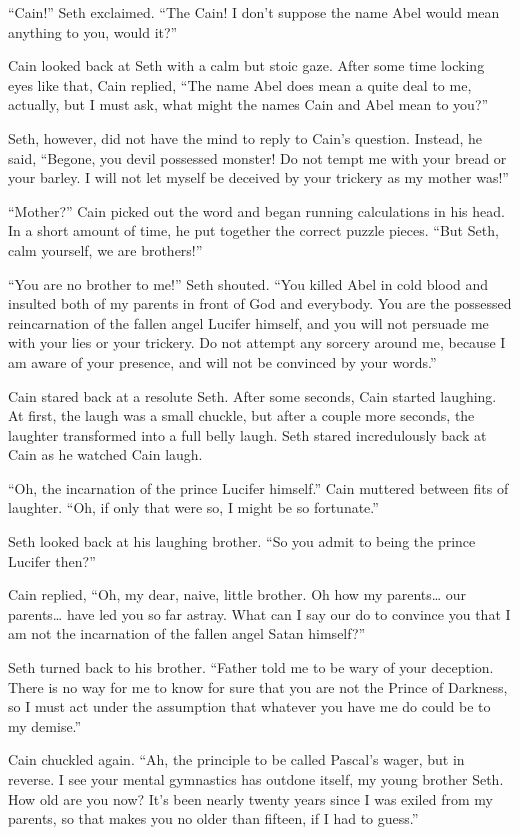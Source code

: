 \documentclass[12pt,twoside,titlepage]{report}
\begin{document}
``Cain!'' Seth exclaimed. ``The Cain! I don't suppose the name Abel
would mean anything to you, would it?''

Cain looked back at Seth with a calm but stoic gaze. After some time
locking eyes like that, Cain replied, ``The name Abel does mean a quite
deal to me, actually, but I must ask, what might the names Cain and Abel
mean to you?''

Seth, however, did not have the mind to reply to Cain's question.
Instead, he said, ``Begone, you devil possessed monster! Do not tempt me
with your bread or your barley. I will not let myself be deceived by
your trickery as my mother was!''

``Mother?'' Cain picked out the word and began running calculations in
his head. In a short amount of time, he put together the correct puzzle
pieces. ``But Seth, calm yourself, we are brothers!''

``You are no brother to me!'' Seth shouted. ``You killed Abel in cold
blood and insulted both of my parents in front of God and everybody. You
are the possessed reincarnation of the fallen angel Lucifer himself, and
you will not persuade me with your lies or your trickery. Do not attempt
any sorcery around me, because I am aware of your presence, and will not
be convinced by your words.''

Cain stared back at a resolute Seth. After some seconds, Cain started
laughing. At first, the laugh was a small chuckle, but after a couple
more seconds, the laughter transformed into a full belly laugh. Seth
stared incredulously back at Cain as he watched Cain laugh.

``Oh, the incarnation of the prince Lucifer himself.'' Cain muttered
between fits of laughter. ``Oh, if only that were so, I might be so
fortunate.''

Seth looked back at his laughing brother. ``So you admit to being the
prince Lucifer then?''

Cain replied, ``Oh, my dear, naive, little brother. Oh how my
parents\ldots{} our parents\ldots{} have led you so far astray. What can
I say our do to convince you that I am not the incarnation of the fallen
angel Satan himself?''

Seth turned back to his brother. ``Father told me to be wary of your
deception. There is no way for me to know for sure that you are not the
Prince of Darkness, so I must act under the assumption that whatever you
have me do could be to my demise.''

Cain chuckled again. ``Ah, the principle to be called Pascal's wager,
but in reverse. I see your mental gymnastics has outdone itself, my
young brother Seth. How old are you now? It's been nearly twenty years
since I was exiled from my parents, so that makes you no older than
fifteen, if I had to guess.''
\end{document}
